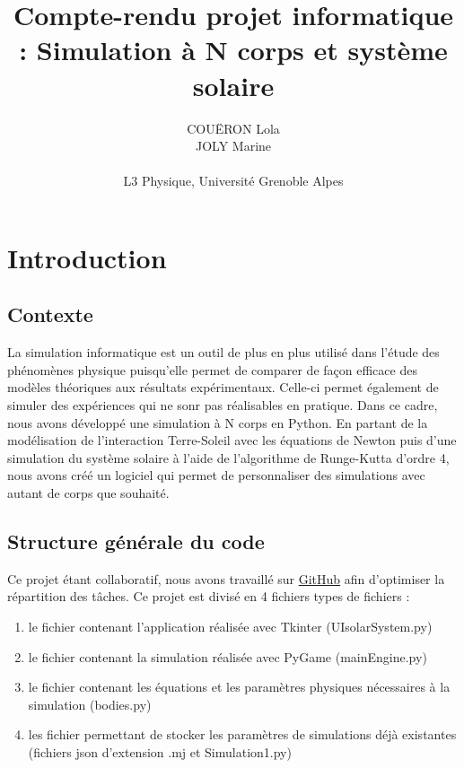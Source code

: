 \documentclass{article}
\title{Compte-rendu projet informatique : Simulation à N corps et système solaire}
\author{COUËRON Lola \\ JOLY Marine \\ \\ L3 Physique, Université Grenoble Alpes}
\begin{document}
\maketitle

{
\hypersetup{hidelinks}

\renewcommand{\contentsname}{Sommaire}
\tableofcontents
}

\newpage

\section{Introduction}
    \subsection{Contexte}
    La simulation informatique est un outil de plus en plus utilisé dans l'étude des phénomènes physique puisqu'elle permet de comparer de façon efficace des modèles théoriques aux résultats expérimentaux. Celle-ci permet également de simuler des expériences qui ne sonr pas réalisables en pratique. Dans ce cadre, nous avons développé une simulation à N corps en Python. En partant de la modélisation de l'interaction Terre-Soleil avec les équations de Newton puis d'une simulation du système solaire à l'aide de l'algorithme de Runge-Kutta d'ordre 4, nous avons créé un logiciel qui permet de personnaliser des simulations avec autant de corps que souhaité.

    \subsection{Structure générale du code}
    Ce projet étant collaboratif, nous avons travaillé sur \href{https://github.com/MJ240103/solarSystem}{GitHub} afin d'optimiser la répartition des tâches. Ce projet est divisé en 4 fichiers types de fichiers : \\

    \begin{enumerate}
        \item le fichier contenant l'application réalisée avec Tkinter (UIsolarSystem.py)
        \item le fichier contenant la simulation réalisée avec PyGame (mainEngine.py)
        \item le fichier contenant les équations et les paramètres physiques nécessaires à la simulation (bodies.py)
        \item les fichier permettant de stocker les paramètres de simulations déjà existantes (fichiers json d'extension .mj et Simulation1.py)
    \end{enumerate}
\end{document}
